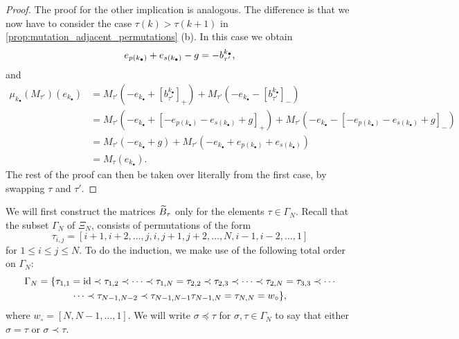 \begin{proof}
	The proof for the other implication is analogous. The difference is that we now have to
	consider the case $\tau(k) > \tau(k+1)$ in \cref{prop:mutation_adjacent_permutations}
	(b). In this case we obtain
	\begin{equation*}
		e_{p(k_\bullet)} + e_{s(k_\bullet)} - g = - b^{k_\bullet}_{\tau'},
	\end{equation*}
	and
	\begin{align*}
		\mu_{k_\bullet}(M_{\tau'})(e_{k_\bullet})
		 & = M_{\tau'}(-e_{k_\bullet} + [b^{k_\bullet}_{\tau'}]_{+}) + M_{\tau'}(-e_{k_\bullet} - [b^{k_\bullet}_{\tau'}]_{-})                                       \\
		 & = M_{\tau'}(-e_{k_\bullet} + [-e_{p(k_\bullet)} - e_{s(k_\bullet)} + g]_{+}) + M_{\tau'}(-e_{k_\bullet} - [-e_{p(k_\bullet)} - e_{s(k_\bullet)} + g]_{-}) \\
		 & = M_{\tau'}(-e_{k_\bullet} + g) + M_{\tau'}(-e_{k_\bullet} + e_{p(k_\bullet)} + e_{s(k_\bullet)})                                                         \\
		 & = M_{\tau}(e_{k_\bullet}).
	\end{align*}
	The rest of the proof can then be taken over literally from the first case, by swapping
	$\tau$ and $\tau'$.

\end{proof}

We will first construct the matrices $\widetilde{B}_\tau$ only for the elements $\tau \in
	\Gamma_N$. Recall that the subset $\Gamma_N$ of $\Xi_N$,
consists of permutations of the form
\begin{equation*}
	\tau_{i, j} = [i+1, i+2, \dots, j, i , j+1, j+2, \dots, N, i-1, i-2, \dots, 1]
\end{equation*}
%
for $1 \leq i \leq j \leq N$. To do the induction, we make use of the following total
order on $\Gamma_N$:
\begin{multline*}
	\Gamma_N = \{\tau_{1,1} = \operatorname{id} \prec \tau_{1,2} \prec \cdots \prec \tau_{1, N} = \tau_{2,2} \prec \tau_{2,3} \prec \cdots \prec \tau_{2,N} = \tau_{3,3} \prec \cdots\\ \cdots \prec \tau_{N-1, N-2} \prec \tau_{N-1, N-1} \tau_{N-1, N} = \tau_{N, N} = w_\circ \},
\end{multline*}
%
where $w_\circ = [N, N-1, \dots, 1]$. We will write $\sigma \preceq \tau$ for $\sigma,
	\tau \in \Gamma_N$ to say that either $\sigma = \tau$ or $\sigma \prec \tau$.

